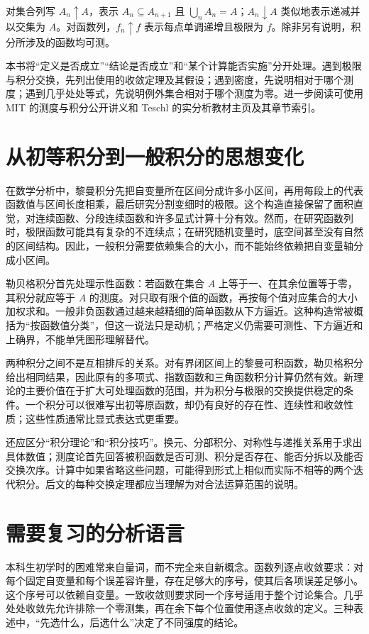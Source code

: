 对集合列写 $A_n\uparrow A$，表示 $A_n\subseteq A_{n+1}$ 且 $\bigcup_nA_n=A$；$A_n\downarrow A$ 类似地表示递减并以交集为 $A$。对函数列，$f_n\uparrow f$ 表示每点单调递增且极限为 $f$。除非另有说明，积分所涉及的函数均可测。

本书将“定义是否成立”“结论是否成立”和“某个计算能否实施”分开处理。遇到极限与积分交换，先列出使用的收敛定理及其假设；遇到密度，先说明相对于哪个测度；遇到几乎处处等式，先说明例外集合相对于哪个测度为零。进一步阅读可使用 MIT 的测度与积分公开讲义\cite{mit-measure}和 Teschl 的实分析教材主页及其章节索引\cite{teschl-ra}。

\section{从初等积分到一般积分的思想变化}
在数学分析中，黎曼积分先把自变量所在区间分成许多小区间，再用每段上的代表函数值与区间长度相乘，最后研究分割变细时的极限。这个构造直接保留了面积直觉，对连续函数、分段连续函数和许多显式计算十分有效。然而，在研究函数列时，极限函数可能具有复杂的不连续点；在研究随机变量时，底空间甚至没有自然的区间结构。因此，一般积分需要依赖集合的大小，而不能始终依赖把自变量轴分成小区间。

勒贝格积分首先处理示性函数：若函数在集合 $A$ 上等于一、在其余位置等于零，其积分就应等于 $A$ 的测度。对只取有限个值的函数，再按每个值对应集合的大小加权求和。一般非负函数通过越来越精细的简单函数从下方逼近。这种构造常被概括为“按函数值分类”，但这一说法只是动机；严格定义仍需要可测性、下方逼近和上确界，不能单凭图形理解替代。

两种积分之间不是互相排斥的关系。对有界闭区间上的黎曼可积函数，勒贝格积分给出相同结果，因此原有的多项式、指数函数和三角函数积分计算仍然有效。新理论的主要价值在于扩大可处理函数的范围，并为积分与极限的交换提供稳定的条件。一个积分可以很难写出初等原函数，却仍有良好的存在性、连续性和收敛性质；这些性质通常比显式表达式更重要。

还应区分“积分理论”和“积分技巧”。换元、分部积分、对称性与递推关系用于求出具体数值；测度论首先回答被积函数是否可测、积分是否存在、能否分拆以及能否交换次序。计算中如果省略这些问题，可能得到形式上相似而实际不相等的两个迭代积分。后文的每种交换定理都应当理解为对合法运算范围的说明。

\section{需要复习的分析语言}
本科生初学时的困难常来自量词，而不完全来自新概念。函数列逐点收敛要求：对每个固定自变量和每个误差容许量，存在足够大的序号，使其后各项误差足够小。这个序号可以依赖自变量。一致收敛则要求同一个序号适用于整个讨论集合。几乎处处收敛先允许排除一个零测集，再在余下每个位置使用逐点收敛的定义。三种表述中，“先选什么，后选什么”决定了不同强度的结论。

